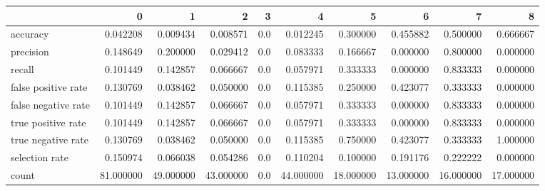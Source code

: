 \begin{tabular}{lrrrrrrrrr}
\toprule
{} &          0 &          1 &          2 &    3 &          4 &          5 &          6 &          7 &          8 \\
\midrule
accuracy            &   0.042208 &   0.009434 &   0.008571 &  0.0 &   0.012245 &   0.300000 &   0.455882 &   0.500000 &   0.666667 \\
precision           &   0.148649 &   0.200000 &   0.029412 &  0.0 &   0.083333 &   0.166667 &   0.000000 &   0.800000 &   0.000000 \\
recall              &   0.101449 &   0.142857 &   0.066667 &  0.0 &   0.057971 &   0.333333 &   0.000000 &   0.833333 &   0.000000 \\
false positive rate &   0.130769 &   0.038462 &   0.050000 &  0.0 &   0.115385 &   0.250000 &   0.423077 &   0.333333 &   0.000000 \\
false negative rate &   0.101449 &   0.142857 &   0.066667 &  0.0 &   0.057971 &   0.333333 &   0.000000 &   0.833333 &   0.000000 \\
true positive rate  &   0.101449 &   0.142857 &   0.066667 &  0.0 &   0.057971 &   0.333333 &   0.000000 &   0.833333 &   0.000000 \\
true negative rate  &   0.130769 &   0.038462 &   0.050000 &  0.0 &   0.115385 &   0.750000 &   0.423077 &   0.333333 &   1.000000 \\
selection rate      &   0.150974 &   0.066038 &   0.054286 &  0.0 &   0.110204 &   0.100000 &   0.191176 &   0.222222 &   0.000000 \\
count               &  81.000000 &  49.000000 &  43.000000 &  0.0 &  44.000000 &  18.000000 &  13.000000 &  16.000000 &  17.000000 \\
\bottomrule
\end{tabular}
